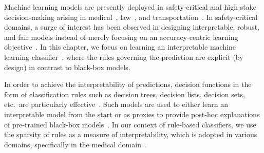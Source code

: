 
\label{chapter:imli}
Machine learning models are presently deployed in safety-critical and high-stake decision-making arising in medical~\cite{erickson2017machine,kaissis2020secure,kononenko2001machine}, law~\cite{kumar2018law,surden2014machine}, and transportation~\cite{peled2019model,zantalis2019review}. In safety-critical domains, a surge of interest has been observed in designing interpretable, robust, and fair models instead of merely focusing on an accuracy-centric learning objective~\cite{bhagoji2018enhancing,doshi2017towards,du2019techniques,hancox2020robustness,holstein2019improving,mehrabi2021survey,molnar2020interpretable,murdoch2019interpretable}. In this chapter, we focus on learning an interpretable machine learning classifier~\cite{rudin2019stop}, where the rules governing the prediction are explicit (by design) in contrast to black-box models. 






In order to achieve the interpretability of predictions, decision functions in the form of classification rules such as decision trees,  decision lists, decision sets, etc.\ are particularly effective~\cite{bessiere2009minimising,dash2021lprules,ignatiev2021reasoning,izza2020explaining,lakkaraju2017interpretable,lakkaraju2016interpretable,letham2015interpretable,narodytska2018learning,rivest1987learning,wang2015falling,yu2020optimal}. Such models are used to either learn an interpretable model from the start or as proxies to provide post-hoc explanations of pre-trained black-box models~\cite{gill2020responsible,lundberg2017unified,moradi2021post,ribeiro2016should,slack2020fooling}.  In our context of rule-based classifiers, we use the sparsity of rules as a measure of interpretability, which is adopted in various domains, specifically in the medical domain~\cite{gage2001validation,lakkaraju2019faithful,letham2015interpretable,malioutov2013exact,myers1962myers}.  

